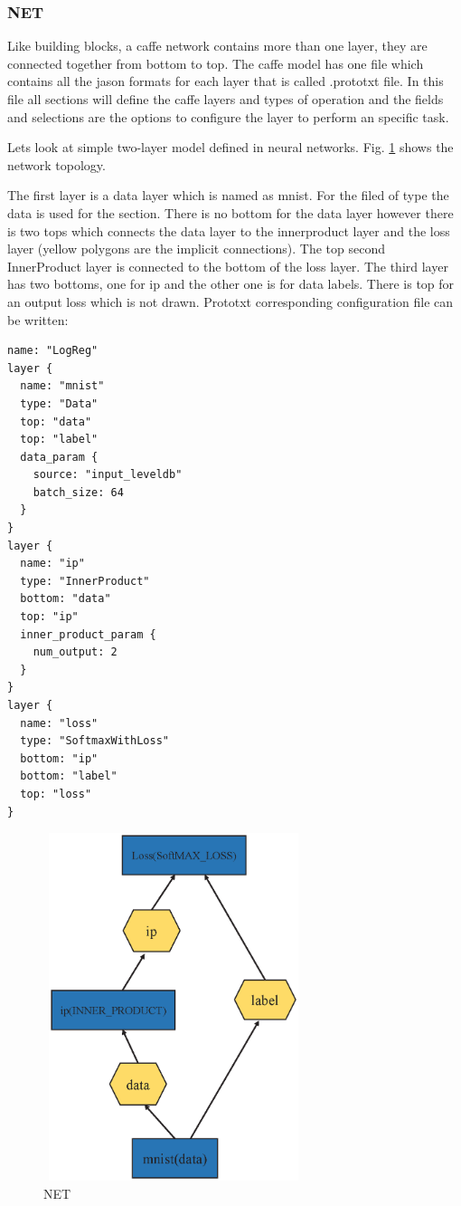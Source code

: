 \documentclass[12pt]{article}
\begin{document}
\subsubsection{NET}\label{NET}

Like building blocks, a caffe network contains more than one layer, they are connected together from bottom to top. The caffe model has one file which contains all the jason formats for each layer that is called .prototxt file. In this file all sections will define the caffe layers and types of operation and the fields and selections are the options to configure the layer to perform an specific task.

Lets look at simple two-layer model defined in neural networks. Fig. \ref{fig:NET} shows the network topology.

\noindent The first layer is a data layer which is named as mnist. For the filed of type the data is used for the section. There is no bottom for the data layer however there is two tops which connects the data layer to the innerproduct layer and the loss layer (yellow polygons are the implicit connections). The top second InnerProduct layer is connected to the bottom of the loss layer. The third layer has two bottoms, one for ip and the other one is for data labels. There is top for an output loss which is not drawn. Prototxt corresponding configuration file can be written:

\begin{lstlisting}[style=json, frame=single]
name: "LogReg"
layer {
  name: "mnist"
  type: "Data"
  top: "data"
  top: "label"
  data_param {
    source: "input_leveldb"
    batch_size: 64
  }
}
layer {
  name: "ip"
  type: "InnerProduct"
  bottom: "data"
  top: "ip"
  inner_product_param {
    num_output: 2
  }
}
layer {
  name: "loss"
  type: "SoftmaxWithLoss"
  bottom: "ip"
  bottom: "label"
  top: "loss"
}
\end{lstlisting}


\begin{figure}[htp]
	\centerline{\includegraphics[width=3in, height=4in]{fig/NET.eps}}
	\caption{NET}
	\label{fig:NET}
\end{figure}
\end{document}
